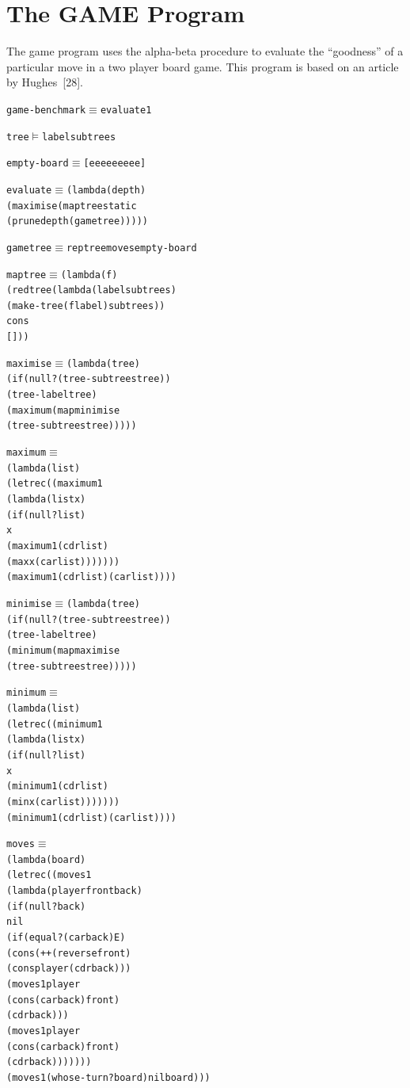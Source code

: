 \section{The GAME Program}

The game program uses the alpha-beta procedure to evaluate the ``goodness'' of a
particular move in a two player board game. This program is based on an article
by Hughes~[28].

\begin{alltt}
game-benchmark \(\equiv\) evaluate 1

tree \(\vDash\) label subtrees

empty-board \(\equiv\) [e e e e e e e e e]

evaluate \(\equiv\) (lambda (depth)
             (maximise (maptree static
                                (prune depth (gametree)))))

gametree \(\equiv\) reptree moves empty-board

maptree \(\equiv\) (lambda (f)
            (redtree (lambda (label subtrees)
                       (make-tree (f label) subtrees))
                     cons
                     []))

maximise \(\equiv\) (lambda (tree)
             (if (null? (tree-subtrees tree))
                 (tree-label tree)
                 (maximum (map minimise
                               (tree-subtrees tree)))))

maximum \(\equiv\)
  (lambda (list)
    (letrec ((maximum1
              (lambda (list x)
                (if (null? list)
                    x
                    (maximum1 (cdr list)
                              (max x (car list)))))))
      (maximum1 (cdr list) (car list))))

minimise \(\equiv\) (lambda (tree)
             (if (null? (tree-subtrees tree))
                 (tree-label tree)
                 (minimum (map maximise
                               (tree-subtrees tree)))))

minimum \(\equiv\)
  (lambda (list)
    (letrec ((minimum1
              (lambda (list x)
                (if (null? list)
                    x
                    (minimum1 (cdr list)
                              (min x (car list)))))))
      (minimum1 (cdr list) (car list))))

moves \(\equiv\)
  (lambda (board)
    (letrec ((moves1
              (lambda (player front back)
                (if (null? back)
                    nil
                    (if (equal? (car back) E)
                        (cons (++ (reverse front)
                                  (cons player (cdr back)))
                              (moves1 player
                                      (cons (car back) front)
                                      (cdr back)))
                        (moves1 player
                                (cons (car back) front)
                                (cdr back)))))))
      (moves1 (whose-turn? board) nil board)))


\end{alltt}
